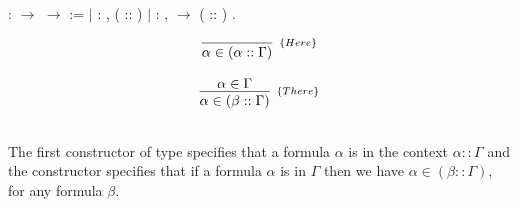 \begin{minipage}[c]{0.6\textwidth}
 \begin{coqdoccode}
\coqdocnoindent
{}  : \coqdocvar{$\Gamma$} \ensuremath{\rightarrow} \coqdocvar{$\alpha$} \ensuremath{\rightarrow}  :=\coqdoceol
\coqdocnoindent
\ensuremath{|}  : \coqdockw{\ensuremath{\forall}}  ,  ( :: ) \coqdoceol
\coqdocnoindent
\ensuremath{|}  : \coqdockw{\ensuremath{\forall}}   ,    \ensuremath{\rightarrow}  ( :: ) .\coqdoceol
\end{coqdoccode}
\end{minipage}
\begin{minipage}[c]{0.3\textwidth}
\[
\begin{array}{c}
\infer[_{\{Here\}}]{\alpha \in (\alpha :: \Gamma)}{}\\ \\
\infer[_{\{There\}}]{\alpha \in (\beta :: \Gamma)}{\alpha \in \Gamma} \\ \\
\end{array}
\]
\end{minipage}
The first constructor of type  specifies that a formula $\alpha$ is in the context $\alpha :: \Gamma$ and
the constructor  specifies that if a formula $\alpha$ is in $\Gamma$ then we have
 $\alpha \in (\beta :: \Gamma)$, for any formula $\beta$.


